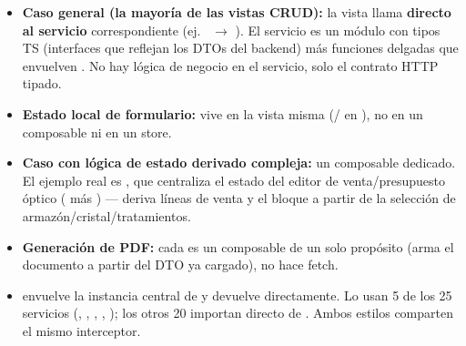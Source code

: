 \begin{itemize}
  \item \textbf{Caso general (la mayoría de las vistas CRUD):} la vista llama \textbf{directo al servicio} correspondiente (ej.\  $\rightarrow$ \allowbreak {}). El servicio es un módulo con tipos TS (interfaces que reflejan los DTOs del backend) más funciones delgadas que envuelven . No hay lógica de negocio en el servicio, solo el contrato HTTP tipado.
  \item \textbf{Estado local de formulario:} vive en la vista misma (/ en ), no en un composable ni en un store.
  \item \textbf{Caso con lógica de estado derivado compleja:} un composable dedicado. El ejemplo real es \allowbreak {}\allowbreak {}, que centraliza el estado del editor de venta/presupuesto óptico ( más \allowbreak {}) --- deriva líneas de venta y el bloque  a partir de la selección de armazón/cristal/tratamientos.
  \item \textbf{Generación de PDF:} cada  es un composable de un solo propósito (arma el documento a partir del DTO ya cargado), no hace fetch.
  \item \textbf{} envuelve la instancia central de  y devuelve  directamente. Lo usan 5 de los 25 servicios (, \allowbreak {}, , , ); los otros 20 importan directo de . Ambos estilos comparten el mismo interceptor.
\end{itemize}

